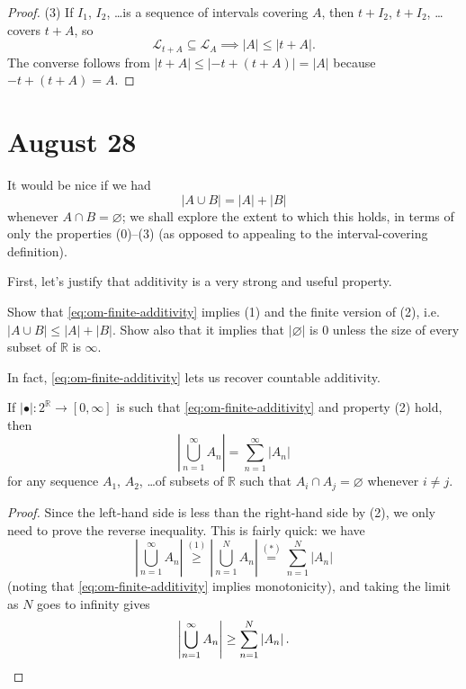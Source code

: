 \documentclass[11pt]{scrartcl}
\providecommand{\RR}{\mathbb R}
\providecommand{\abs}[1]{\left\lvert #1\right\rvert}
\begin{document}
\begin{proof}
    (3) If $I_1$, $I_2$, \dots is a sequence of intervals covering $A$,
    then $t+I_2$, $t+I_2$, \dots covers $t+A$, so
    \begin{equation*}
	\mathcal L_{t+A}\subseteq\mathcal L_A\implies |A|\le |t+A|.
    \end{equation*}
    The converse follows from $|t+A|\le \lvert-t + (t+A)\rvert = |A|$
    because $-t + (t+A) = A$.
\end{proof}

\section{August 28}\label{sec:aug28}

It would be nice if we had
\begin{equation}\tag{\textasteriskcentered}
    \label{eq:om-finite-additivity}
    |A\cup B| = |A| + |B|
\end{equation}
whenever $A\cap B=\varnothing$; we shall explore the extent to which this holds,
in terms of only the properties (0)--(3) (as opposed to appealing to
the interval-covering definition).

First, let's justify that additivity is a very strong and useful property.

\begin{exercise}
    Show that \autoref{eq:om-finite-additivity} implies (1)
    and the finite version of (2), i.e. $\abs{A\cup B}\le \abs{A}+\abs{B}$.
    Show also that it implies that $\abs{\varnothing}$ is $0$
    unless the size of every subset of $\RR$ is $\infty$.
\end{exercise}

In fact, \autoref{eq:om-finite-additivity} lets us recover countable additivity.
\begin{prop}
    \label{prop:finadd-and-ctablesubadd-implies-ctableadd}
    If $\abs\bullet\colon 2^\RR\to[0,\infty]$ is
    such that \autoref{eq:om-finite-additivity} and property (2) hold, then
    \begin{equation*}
	\abs{\bigcup_{n=1}^\infty A_n} = \sum_{n=1}^\infty \abs{A_n}
    \end{equation*}
    for any sequence $A_1$, $A_2$, \dots of subsets of $\RR$
    such that $A_i\cap A_j=\varnothing$ whenever $i\ne j$.
\end{prop}

\begin{proof}
    Since the left-hand side is less than the right-hand side by (2),
    we only need to prove the reverse inequality.
    This is fairly quick: we have
    \begin{equation*}
	\abs{\bigcup_{n=1}^\infty A_n} \overset{(1)}\ge
	\abs{\bigcup_{n=1}^N A_n} \overset{(*)}= \sum_{n=1}^N \abs{A_n}
    \end{equation*}
    (noting that \autoref{eq:om-finite-additivity} implies monotonicity),
    and taking the limit as $N$ goes to infinity gives
    \begin{equation*}
	\abs{\bigcup_{n=1}^\infty A_n} \ge \sum_{n=1}^N \abs{A_n}.\qedhere
    \end{equation*}
\end{proof}
\end{document}
